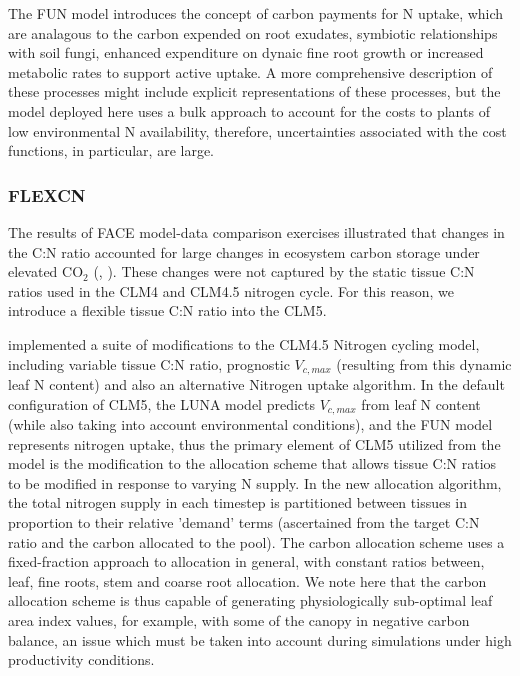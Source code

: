 \documentclass[draft,linenumbers]{agujournal}
\begin{document}
The FUN model introduces the concept of carbon payments for N uptake, which are analagous to the carbon expended on root exudates, symbiotic relationships with soil fungi, enhanced expenditure on dynaic fine root growth or increased metabolic rates to support active uptake. A more comprehensive description of these processes might include explicit representations of these processes, but the model deployed here uses a bulk approach to account for the costs to plants of low environmental N availability, therefore, uncertainties associated with the cost functions, in particular, are large. 

\subsubsection{FLEXCN}
The results of FACE model-data comparison exercises illustrated that changes in the C:N ratio accounted for large changes in ecosystem carbon storage under elevated CO$_{2}$ (\cite{zaehle2014}, \cite{medlyn2015using}).  These changes were not captured by the static tissue C:N ratios used in the CLM4 and CLM4.5 nitrogen cycle. For this reason, we introduce a flexible tissue C:N ratio into the CLM5.

\cite{ghimire2016} implemented a suite of modifications to the CLM4.5 Nitrogen cycling model, including variable tissue C:N ratio, prognostic $V_{c,max}$ (resulting from this dynamic leaf N content) and also an alternative Nitrogen uptake algorithm. In the default configuration of CLM5, the LUNA model predicts $V_{c,max}$ from leaf N content (while also taking into account environmental conditions), and the FUN model represents nitrogen uptake, thus the primary element of CLM5 utilized from the \cite{ghimire2016} model is the modification to the allocation scheme that allows tissue C:N ratios to be modified in response to varying N supply. In the new allocation algorithm, the total nitrogen supply in each timestep is partitioned between tissues in proportion to their relative 'demand' terms (ascertained from the target C:N ratio and the carbon allocated to the pool).  The carbon allocation scheme uses a fixed-fraction approach to allocation in general, with constant ratios between, leaf, fine roots, stem and coarse root allocation. We note here that the carbon allocation scheme is thus capable of generating physiologically sub-optimal leaf area index values, for example, with some of the canopy in negative carbon balance, an issue which must be taken into account during simulations under high productivity conditions. 
\end{document}
